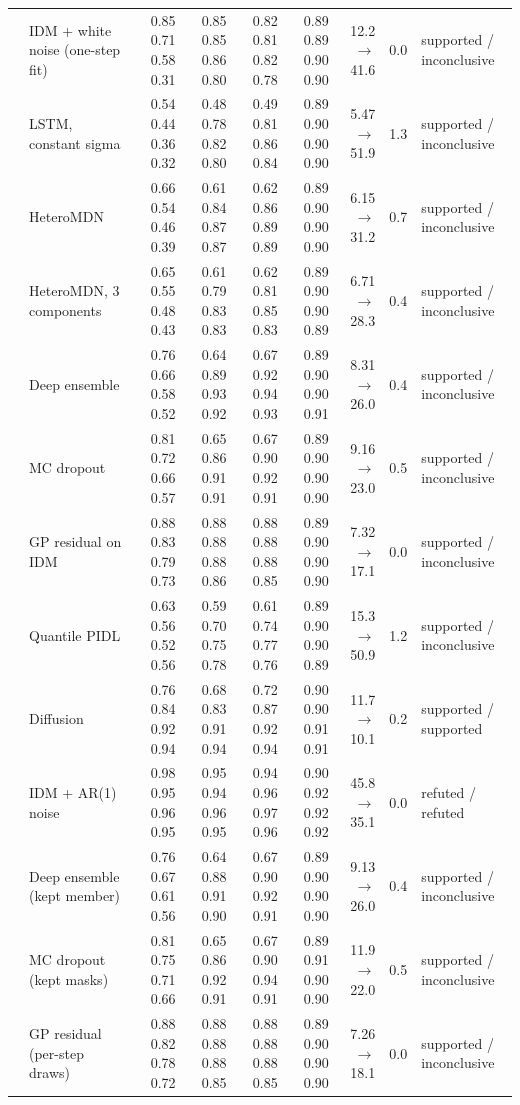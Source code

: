 \begin{longtable}{llrrrrrrl}
 & IDM + white noise (one-step fit) & 0.85 0.71 0.58 0.31 & 0.85 0.85 0.86 0.80 & 0.82 0.81 0.82 0.78 & 0.89 0.89 0.90 0.90 & 12.2 $\rightarrow$ 41.6 & 0.0 & supported / inconclusive \\
 & LSTM, constant sigma & 0.54 0.44 0.36 0.32 & 0.48 0.78 0.82 0.80 & 0.49 0.81 0.86 0.84 & 0.89 0.90 0.90 0.90 & 5.47 $\rightarrow$ 51.9 & 1.3 & supported / inconclusive \\
 & HeteroMDN & 0.66 0.54 0.46 0.39 & 0.61 0.84 0.87 0.87 & 0.62 0.86 0.89 0.89 & 0.89 0.90 0.90 0.90 & 6.15 $\rightarrow$ 31.2 & 0.7 & supported / inconclusive \\
 & HeteroMDN, 3 components & 0.65 0.55 0.48 0.43 & 0.61 0.79 0.83 0.83 & 0.62 0.81 0.85 0.83 & 0.89 0.90 0.90 0.89 & 6.71 $\rightarrow$ 28.3 & 0.4 & supported / inconclusive \\
 & Deep ensemble & 0.76 0.66 0.58 0.52 & 0.64 0.89 0.93 0.92 & 0.67 0.92 0.94 0.93 & 0.89 0.90 0.90 0.91 & 8.31 $\rightarrow$ 26.0 & 0.4 & supported / inconclusive \\
 & MC dropout & 0.81 0.72 0.66 0.57 & 0.65 0.86 0.91 0.91 & 0.67 0.90 0.92 0.91 & 0.89 0.90 0.90 0.90 & 9.16 $\rightarrow$ 23.0 & 0.5 & supported / inconclusive \\
 & GP residual on IDM & 0.88 0.83 0.79 0.73 & 0.88 0.88 0.88 0.86 & 0.88 0.88 0.88 0.85 & 0.89 0.90 0.90 0.90 & 7.32 $\rightarrow$ 17.1 & 0.0 & supported / inconclusive \\
 & Quantile PIDL & 0.63 0.56 0.52 0.56 & 0.59 0.70 0.75 0.78 & 0.61 0.74 0.77 0.76 & 0.89 0.90 0.90 0.89 & 15.3 $\rightarrow$ 50.9 & 1.2 & supported / inconclusive \\
 & Diffusion & 0.76 0.84 0.92 0.94 & 0.68 0.83 0.91 0.94 & 0.72 0.87 0.92 0.94 & 0.90 0.90 0.91 0.91 & 11.7 $\rightarrow$ 10.1 & 0.2 & supported / supported \\
 & IDM + AR(1) noise & 0.98 0.95 0.96 0.95 & 0.95 0.94 0.96 0.95 & 0.94 0.96 0.97 0.96 & 0.90 0.92 0.92 0.92 & 45.8 $\rightarrow$ 35.1 & 0.0 & refuted / refuted \\
 & Deep ensemble (kept member) & 0.76 0.67 0.61 0.56 & 0.64 0.88 0.91 0.90 & 0.67 0.90 0.92 0.91 & 0.89 0.90 0.90 0.90 & 9.13 $\rightarrow$ 26.0 & 0.4 & supported / inconclusive \\
 & MC dropout (kept masks) & 0.81 0.75 0.71 0.66 & 0.65 0.86 0.92 0.91 & 0.67 0.90 0.94 0.91 & 0.89 0.91 0.90 0.90 & 11.9 $\rightarrow$ 22.0 & 0.5 & supported / inconclusive \\
 & GP residual (per-step draws) & 0.88 0.82 0.78 0.72 & 0.88 0.88 0.88 0.85 & 0.88 0.88 0.88 0.85 & 0.89 0.90 0.90 0.90 & 7.26 $\rightarrow$ 18.1 & 0.0 & supported / inconclusive \\
\end{longtable}
\endgroup
